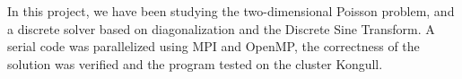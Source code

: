 In this project, we have been studying the two-dimensional Poisson problem, and a discrete solver based on diagonalization and the Discrete Sine Transform. A serial code was parallelized using MPI and OpenMP, the correctness of the solution was verified and the program tested on the cluster Kongull. 